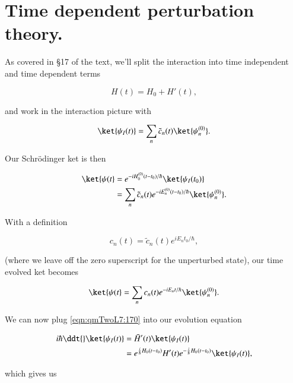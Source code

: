 \section{Time dependent perturbation theory.}

As covered in \S 17 of the text, we'll split the interaction into time independent and time dependent terms

\begin{equation}\label{eqn:qmTwoL7:150}
H(t) = H_0 + H'(t),
\end{equation}

and work in the interaction picture with

\begin{equation}\label{eqn:qmTwoL7:170}
\ket{\psi_I(t)} = \sum_n \tilde{c}_n(t) \ket{\psi_n^{(0)} }.
\end{equation}

Our Schr\"{o}dinger ket is then

\begin{equation}\label{eqn:qmTwoL7:190}
\begin{aligned}
\ket{\psi(t}
&=
e^{-i H_0^{(0)}(t- t_0)/\hbar}
\ket{\psi_I(t_0) } \\
&=
\sum_n \tilde{c}_n(t)
e^{-i E_n^{(0)}(t- t_0)/\hbar}
\ket{\psi_n^{(0)} }.
\end{aligned}
\end{equation}

With a definition

\begin{equation}\label{eqn:qmTwoL7:210}
c_n(t) = \tilde{c}_n(t) e^{i E_n t_0/\hbar},
\end{equation}

(where we leave off the zero superscript for the unperturbed state), our time evolved ket becomes

\begin{equation}\label{eqn:qmTwoL7:230}
\ket{\psi(t}
=
\sum_n c_n(t)
e^{-i E_n t/\hbar}
\ket{\psi_n^{(0)} }.
\end{equation}

We can now plug \ref{eqn:qmTwoL7:170} into our evolution equation

\begin{align*}
i\hbar \ddt{} \ket{\psi_I(t)}
&=
\bar{H}'(t) \ket{\psi_I(t)} \\
&=
e^{\frac{i}{\hbar} H_0(t - t_0)} H'(t) e^{-\frac{i}{\hbar} H_0(t - t_0)}
\ket{\psi_I(t)},
\end{align*}

which gives us

